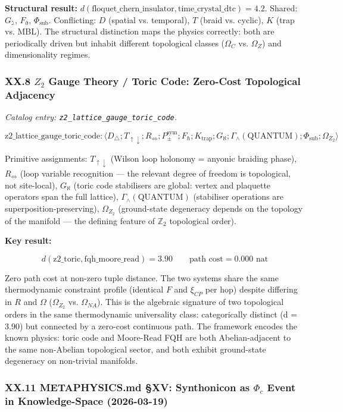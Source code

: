 \documentclass[12pt,a4paper]{article}
\begin{document}
\textbf{Structural result:} $d(\text{floquet\_chern\_insulator}, \text{time\_crystal\_dtc}) = 4.2$. Shared: $G_{\gimel}$, $F_{\eth}$, $\Phi_{\text{sub}}$. Conflicting: $D$ (spatial vs. temporal), $T$ (braid vs. cyclic), $K$ (trap vs. MBL). The structural distinction maps the physics correctly: both are periodically driven but inhabit different topological classes ($\Omega_C$ vs. $\Omega_Z$) and dimensionality regimes.

\subsubsection{XX.8 $Z_2$ Gauge Theory / Toric Code: Zero-Cost Topological Adjacency}

\emph{Catalog entry: \texttt{z2\_lattice\_gauge\_toric\_code}.}

\[\text{z2\_lattice\_gauge\_toric\_code}: \langle D_{\bigtriangleup}; T_{\uparrow\downarrow}; R_{\Leftrightarrow}; P_{\pm}^{\text{sym}}; F_{\hbar}; K_{\text{trap}}; G_{\aleph}; \Gamma_{\wedge}(\text{QUANTUM}); \Phi_{\text{sub}}; \Omega_{Z_2} \rangle\]

Primitive assignments: $T_{\uparrow\downarrow}$ (Wilson loop holonomy = anyonic braiding phase), $R_{\Leftrightarrow}$ (loop variable recognition --- the relevant degree of freedom is topological, not site-local), $G_{\aleph}$ (toric code stabilisers are global: vertex and plaquette operators span the full lattice), $\Gamma_{\wedge}(\text{QUANTUM})$ (stabiliser operations are superposition-preserving), $\Omega_{Z_2}$ (ground-state degeneracy depends on the topology of the manifold --- the defining feature of $\mathbb{Z}_2$ topological order).

\textbf{Key result:}

\[d(\text{z2\_toric}, \text{fqh\_moore\_read}) = 3.90 \qquad \text{path cost} = 0.000 \text{ nat}\]

Zero path cost at non-zero tuple distance. The two systems share the same thermodynamic constraint profile (identical $F$ and $\xi_{CP}$ per hop) despite differing in $R$ and $\Omega$ ($\Omega_{Z_2}$ vs. $\Omega_{NA}$). This is the algebraic signature of two topological orders in the same thermodynamic universality class: categorically distinct (d = 3.90) but connected by a zero-cost continuous path. The framework encodes the known physics: toric code and Moore-Read FQH are both Abelian-adjacent to the same non-Abelian topological sector, and both exhibit ground-state degeneracy on non-trivial manifolds.

\subsubsection{XX.11 METAPHYSICS.md §XV: Synthonicon as $\Phi_c$ Event in Knowledge-Space (2026-03-19)}
\end{document}
